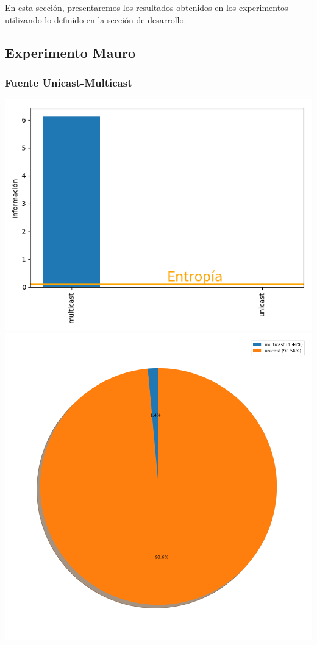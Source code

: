 En esta secci\'on, presentaremos los resultados obtenidos en los experimentos utilizando lo definido en la secci\'on de desarrollo.

\subsection{Experimento Mauro}

\subsubsection{Fuente Unicast-Multicast}

 \includegraphics[scale=0.6]{../plots/mauro_s1_informacion.png}
 \includegraphics[scale=0.4]{../plots/mauro_s1_probabilidades.png}

